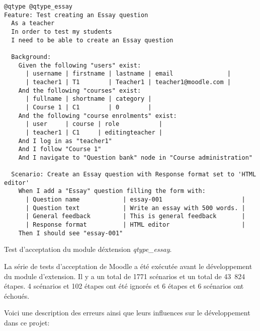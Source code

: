\begin{lstfloat}
\begin{lstlisting}[frame=l]
@qtype @qtype_essay
Feature: Test creating an Essay question
  As a teacher
  In order to test my students
  I need to be able to create an Essay question

  Background:
    Given the following "users" exist:
      | username | firstname | lastname | email               |
      | teacher1 | T1        | Teacher1 | teacher1@moodle.com |
    And the following "courses" exist:
      | fullname | shortname | category |
      | Course 1 | C1        | 0        |
    And the following "course enrolments" exist:
      | user     | course | role           |
      | teacher1 | C1     | editingteacher |
    And I log in as "teacher1"
    And I follow "Course 1"
    And I navigate to "Question bank" node in "Course administration"

  Scenario: Create an Essay question with Response format set to 'HTML editor'
    When I add a "Essay" question filling the form with:
      | Question name            | essay-001                      |
      | Question text            | Write an essay with 500 words. |
      | General feedback         | This is general feedback       |
      | Response format          | HTML editor                    |
    Then I should see "essay-001"
\end{lstlisting}
\caption{Test d'acceptation du module d\'extension \textit{qtype\_essay}.}
\label{code:behattest}
\end{lstfloat}

La série de tests d'acceptation de Moodle a été exécutée avant le développement du module d'extension.
Il y a un total de 1771 scénarios et un total de 43~824 étapes.
4 scénarios et 102 étapes ont été ignorés et 6 étapes et 6 scénarios ont échoués.

Voici une description des erreurs ainsi que leurs influences sur le développement dans ce projet:

